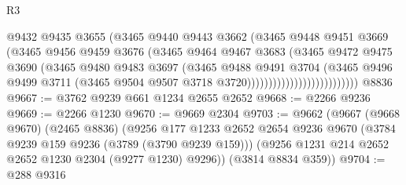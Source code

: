 \begin{lexlean}{R3}
\begin{coremodule}
                                      @9432
                                      @9435
                                      @3655
                                      (@3465
                                        @9440
                                        @9443
                                        @3662
                                        (@3465
                                          @9448
                                          @9451
                                          @3669
                                          (@3465
                                            @9456
                                            @9459
                                            @3676
                                            (@3465
                                              @9464
                                              @9467
                                              @3683
                                              (@3465
                                                @9472
                                                @9475
                                                @3690
                                                (@3465
                                                  @9480
                                                  @9483
                                                  @3697
                                                  (@3465
                                                    @9488
                                                    @9491
                                                    @3704
                                                    (@3465
                                                      @9496
                                                      @9499
                                                      @3711
                                                      (@3465
                                                        @9504
                                                        @9507
                                                        @3718
                                                        @3720))))))))))))))))))))))))))
    @8836
@9667 := @3762 @9239 @661 @1234 @2655 @2652
@9668 := @2266 @9236
@9669 := @2266 @1230
@9670 := @9669 @2304
@9703 := @9662
    (@9667
      (@9668 @9670)
      (@2465 @8836)
      (@9256
        @177
        @1233
        @2652
        @2654
        @9236
        @9670
        (@3784 @9239 @159 @9236 (@3789 (@3790 @9239 @159)))
        (@9256 @1231 @214 @2652 @2652 @1230 @2304 (@9277 @1230) @9296))
      (@3814 @8834 @359))
@9704 := @288 @9316

\end{coremodule}
\end{lexlean}
